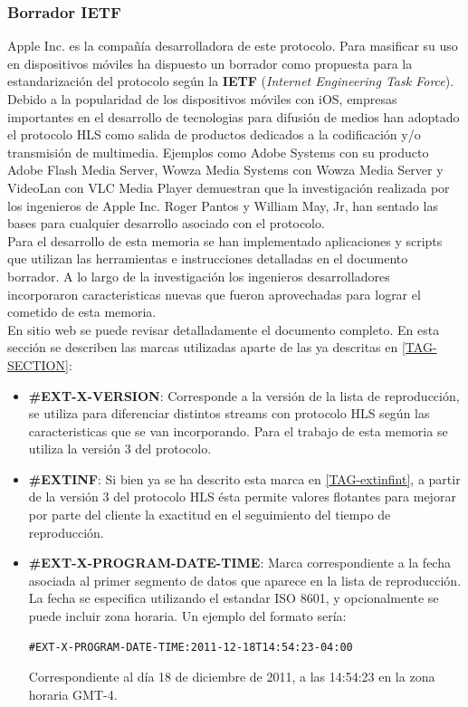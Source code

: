 \subsubsection{Borrador IETF}
Apple Inc. es la compañía desarrolladora de este protocolo. Para masificar su uso en dispositivos móviles ha dispuesto un borrador como propuesta para la estandarización del protocolo según la \textbf{IETF} (\textit{Internet Engineering Task Force}).
Debido a la popularidad de los dispositivos móviles con iOS, empresas importantes en el desarrollo de tecnologias para difusión de medios han adoptado el protocolo HLS como salida de productos dedicados a la codificación y/o transmisión de multimedia. Ejemplos como Adobe Systems con su producto Adobe Flash Media Server, Wowza Media Systems con Wowza Media Server y VideoLan con VLC Media Player demuestran que la investigación realizada por los ingenieros de Apple Inc. Roger Pantos y William May, Jr, han sentado las bases para cualquier desarrollo asociado con el protocolo.\\

Para el desarrollo de esta memoria se han implementado aplicaciones y scripts que utilizan las herramientas e instrucciones detalladas en el documento borrador. A lo largo de la investigación los ingenieros desarrolladores incorporaron caracteristicas nuevas que fueron aprovechadas para lograr el cometido de esta memoria.\\

En sitio web \cite{apple-draftpantos} se puede revisar detalladamente el documento completo. En esta sección se describen las marcas utilizadas aparte de las ya descritas en \ref{TAG-SECTION}:

\begin{itemize}
\item \textbf{\#EXT-X-VERSION}: Corresponde a la versión de la lista de reproducción, se utiliza para diferenciar distintos streams con protocolo HLS según las caracteristicas que se van incorporando. Para el trabajo de esta memoria se utiliza la versión 3 del protocolo.

\item \textbf{\#EXTINF}: Si bien ya se ha descrito esta marca en \ref{TAG-extinfint}, a partir de la versión 3 del protocolo HLS ésta permite valores flotantes para mejorar por parte del cliente la exactitud en el seguimiento del tiempo de reproducción. 

\item \textbf{\#EXT-X-PROGRAM-DATE-TIME}: Marca correspondiente a la fecha asociada al primer segmento de datos que aparece en la lista de reproducción. La fecha se especifica utilizando el estandar ISO 8601, y opcionalmente se puede incluir zona horaria. Un ejemplo del formato sería:

\begin{lstlisting}
#EXT-X-PROGRAM-DATE-TIME:2011-12-18T14:54:23-04:00
\end{lstlisting}

Correspondiente al día 18 de diciembre de 2011, a las 14:54:23 en la zona horaria GMT-4.

\end{itemize}
